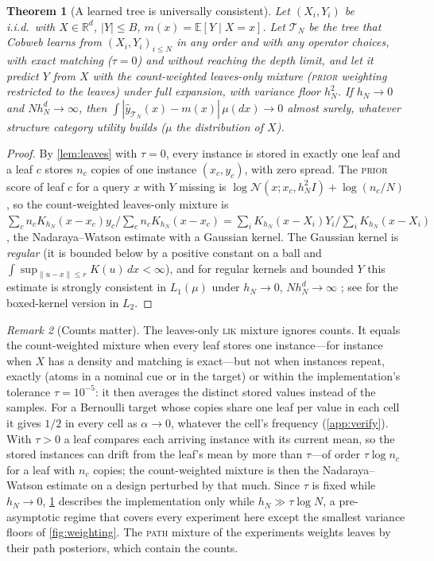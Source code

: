 \documentclass[11pt]{article}
\newtheorem{theorem}{Theorem}
\theoremstyle{definition}
\theoremstyle{remark}
\newtheorem{remark}[theorem]{Remark}
\newcommand{\R}{\mathbb{R}}
\newcommand{\E}{\mathbb{E}}
\newcommand{\N}{\mathcal{N}}
\newcommand{\T}{\mathcal{T}}
\newcommand{\hy}{\hat{y}}
\begin{document}
\begin{theorem}[A learned tree is universally consistent]\label{thm:consistency}
Let $(X_i,Y_i)$ be i.i.d.\ with $X\in\R^d$, $|Y|\le B$, $m(x)=\E[Y\mid X=x]$.
Let $\T_N$ be the tree that Cobweb learns from $(X_i,Y_i)_{i\le N}$ in any order and with
any operator choices, with exact matching ($\tau=0$) and without reaching the depth
limit, and let it predict $Y$ from $X$ with the \emph{count-weighted} leaves-only mixture
(\textsc{prior} weighting restricted to the leaves) under full expansion, with variance
floor $h_N^2$.  If $h_N\to0$ and $Nh_N^d\to\infty$, then
$\int|\hy_{\T_N}(x)-m(x)|\,\mu(dx)\to0$ almost surely, whatever structure category
utility builds ($\mu$ the distribution of $X$).
\end{theorem}
\begin{proof}
By \cref{lem:leaves} with $\tau=0$, every instance is stored in exactly one leaf and a
leaf $c$ stores $n_c$ copies of one instance $(x_c,y_c)$, with zero spread.  The
\textsc{prior} score of leaf $c$ for a query $x$ with $Y$ missing is
$\log\N(x;x_c,h_N^2I)+\log(n_c/N)$, so the count-weighted leaves-only mixture is
$\sum_cn_cK_{h_N}(x-x_c)y_c/\sum_cn_cK_{h_N}(x-x_c)=\sum_iK_{h_N}(x-X_i)Y_i/\sum_iK_{h_N}(x-X_i)$,
the Nadaraya--Watson estimate with a Gaussian kernel.  The Gaussian kernel is \emph{regular} (it is bounded below by a
positive constant on a ball and $\int\sup_{\|u-x\|\le r}K(u)\,dx<\infty$), and for
regular kernels and bounded $Y$ this estimate is strongly consistent in $L_1(\mu)$
under $h_N\to0$, $Nh_N^d\to\infty$ \citep{devroye1989}; see \citet[Ch.~5]{gyorfi2002}
for the boxed-kernel version in $L_2$.
\end{proof}

\begin{remark}[Counts matter]\label{rem:counts}
The leaves-only \textsc{lik} mixture ignores counts.  It equals the count-weighted mixture
when every leaf stores one instance---for instance when $X$ has a density and matching is
exact---but not when instances repeat, exactly (atoms in a nominal cue or in the target)
or within the implementation's tolerance $\tau=10^{-5}$: it then averages the distinct
stored values instead of the samples.  For a Bernoulli target whose copies share one leaf
per value in each cell it gives $1/2$ in every cell as $\alpha\to0$, whatever the cell's
frequency (\cref{app:verify}).  With $\tau>0$ a leaf compares each arriving instance with its current
mean, so the stored instances can drift from the leaf's mean by more than $\tau$---of order
$\tau\log n_c$ for a leaf with $n_c$ copies; the count-weighted mixture is then the
Nadaraya--Watson estimate on a design perturbed by that much.  Since $\tau$ is fixed while
$h_N\to0$, \cref{thm:consistency} describes the implementation only while
$h_N\gg\tau\log N$, a pre-asymptotic regime that covers every experiment here except the
smallest variance floors of \cref{fig:weighting}.  The
\textsc{path} mixture of the experiments weights leaves by their path posteriors, which
contain the counts.
\end{remark}
\end{document}
